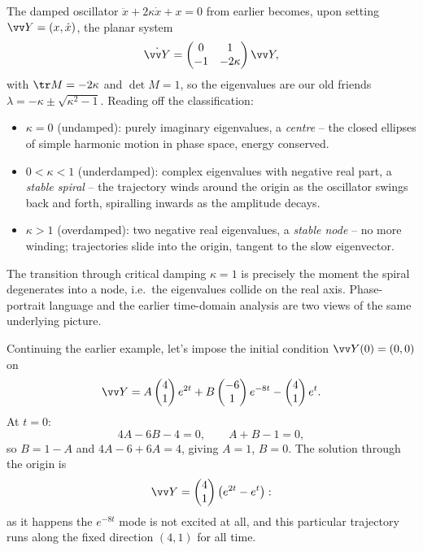 \begin{example}
	The damped oscillator $\ddot x + 2\kappa \dot x + x = 0$ from earlier becomes, upon setting $\vv Y = (x, \dot x)$, the planar system
	$$
	\dot{\vv Y} = \begin{pmatrix} 0 & 1 \\ -1 & -2\kappa \end{pmatrix} \vv Y,
	$$
	with $\tr M = -2\kappa$ and $\det M = 1$, so the eigenvalues are our old friends $\lambda = -\kappa \pm \sqrt{\kappa^2 - 1}$. Reading off the classification:
	\begin{itemize}
		\item $\kappa = 0$ (undamped): purely imaginary eigenvalues, a \emph{centre} -- the closed ellipses of simple harmonic motion in phase space, energy conserved.
		\item $0 < \kappa < 1$ (underdamped): complex eigenvalues with negative real part, a \emph{stable spiral} -- the trajectory winds around the origin as the oscillator swings back and forth, spiralling inwards as the amplitude decays.
		\item $\kappa > 1$ (overdamped): two negative real eigenvalues, a \emph{stable node} -- no more winding; trajectories slide into the origin, tangent to the slow eigenvector.
	\end{itemize}
	The transition through critical damping $\kappa = 1$ is precisely the moment the spiral degenerates into a node, i.e.\ the eigenvalues collide on the real axis. Phase-portrait language and the earlier time-domain analysis are two views of the same underlying picture.
\end{example}

\begin{example}
	Continuing the earlier example, let's impose the initial condition $\vv Y(0) = (0, 0)$ on
	$$
	\vv Y = A \begin{pmatrix} 4 \\ 1 \end{pmatrix} e^{2t} + B \begin{pmatrix} -6 \\ 1 \end{pmatrix} e^{-8t} - \begin{pmatrix} 4 \\ 1 \end{pmatrix} e^t.
	$$
	At $t = 0$:
	$$
	4A - 6B - 4 = 0, \qquad A + B - 1 = 0,
	$$
	so $B = 1 - A$ and $4A - 6 + 6A = 4$, giving $A = 1$, $B = 0$. The solution through the origin is
	$$
	\vv Y = \begin{pmatrix} 4 \\ 1\end{pmatrix}\left(e^{2t} - e^t\right):
	$$
	as it happens the $e^{-8t}$ mode is not excited at all, and this particular trajectory runs along the fixed direction $(4, 1)$ for all time.
\end{example}

